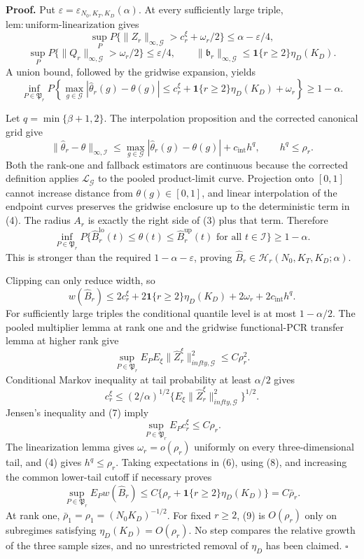 \textbf{Proof.}
Put \(\varepsilon=\varepsilon_{N_0,K_T,K_D}(\alpha)\).  At every
sufficiently large triple, \(\mathrm{lem:uniform\mbox{-}linearization}\)
gives
\[
 \sup_PP\{\|Z_r\|_{\infty,\mathcal G}>c_r^\xi+\omega_r/2\}
 \le\alpha-\varepsilon/4,                                  \tag{1}
\]
\[
 \sup_PP\{\|Q_r\|_{\infty,\mathcal G}>\omega_r/2\}
 \le\varepsilon/4,
 \qquad
 \|\mathfrak b_r\|_{\infty,\mathcal G}
 \le\mathbf1\{r\ge2\}\eta_D(K_D).                        \tag{2}
\]
A union bound, followed by the gridwise expansion, yields
\[
 \inf_{P\in\mathfrak P_r}P\left\{
 \max_{g\in\mathcal G}|\widehat\theta_r(g)-\theta(g)|
 \le c_r^\xi+\mathbf1\{r\ge2\}\eta_D(K_D)+\omega_r
 \right\}\ge1-\alpha.                                     \tag{3}
\]

Let \(q=\min\{\beta+1,2\}\).  The interpolation proposition and the
corrected canonical grid give
\[
 \|\widehat\theta_r-\theta\|_{\infty,\mathcal I}
 \le\max_{g\in\mathcal G}|\widehat\theta_r(g)-\theta(g)|
   +c_{\mathrm{int}}h^q,
 \qquad h^q\le\rho_r.                                      \tag{4}
\]
Both the rank-one and fallback estimators are continuous because the
corrected definition applies \(\mathcal L_{\mathcal G}\) to the pooled
product-limit curve.  Projection onto \([0,1]\) cannot increase distance
from \(\theta(g)\in[0,1]\), and linear interpolation of the endpoint
curves preserves the gridwise enclosure up to the deterministic term in
(4).  The radius \(A_r\) is exactly the right side of (3) plus that term.
Therefore
\[
 \inf_{P\in\mathfrak P_r}P\{\widehat B_r^{\mathrm{lo}}(t)
 \le\theta(t)\le\widehat B_r^{\mathrm{up}}(t)
 \text{ for all }t\in\mathcal I\}\ge1-\alpha.              \tag{5}
\]
This is stronger than the required \(1-\alpha-\varepsilon\), proving
\(\widehat B_r\in\mathcal H_r(N_0,K_T,K_D;\alpha)\).

Clipping can only reduce width, so
\[
 w(\widehat B_r)
 \le2c_r^\xi+2\mathbf1\{r\ge2\}\eta_D(K_D)
      +2\omega_r+2c_{\mathrm{int}}h^q.                    \tag{6}
\]
For sufficiently large triples the conditional quantile level is at most
\(1-\alpha/2\).  The pooled multiplier lemma at rank one and the gridwise
functional-PCR transfer lemma at higher rank give
\[
 \sup_{P\in\mathfrak P_r}E_PE_\xi
 \|\widehat Z_r^\xi\|_{infty,\mathcal G}^2\le C\rho_r^2. \tag{7}
\]
Conditional Markov inequality at tail probability at least \(\alpha/2\)
gives
\[
 c_r^\xi\le(2/\alpha)^{1/2}
 \{E_\xi\|\widehat Z_r^\xi\|_{infty,\mathcal G}^2\}^{1/2}.
\]
Jensen's inequality and (7) imply
\[
 \sup_{P\in\mathfrak P_r}E_Pc_r^\xi\le C\rho_r.           \tag{8}
\]
The linearization lemma gives \(\omega_r=o(\rho_r)\) uniformly on every
three-dimensional tail, and (4) gives \(h^q\le\rho_r\).  Taking
expectations in (6), using (8), and increasing the common lower-tail cutoff
if necessary proves
\[
 \sup_{P\in\mathfrak P_r}E_Pw(\widehat B_r)
 \le C\{\rho_r+\mathbf1\{r\ge2\}\eta_D(K_D)\}
 =C\bar\rho_r.                                              \tag{9}
\]
At rank one, \(\bar\rho_1=\rho_1=(N_0K_D)^{-1/2}\).  For fixed
\(r\ge2\), (9) is \(O(\rho_r)\) only on subregimes satisfying
\(\eta_D(K_D)=O(\rho_r)\).  No step compares the relative growth of the
three sample sizes, and no unrestricted removal of \(\eta_D\) has been
claimed. \(\square\)